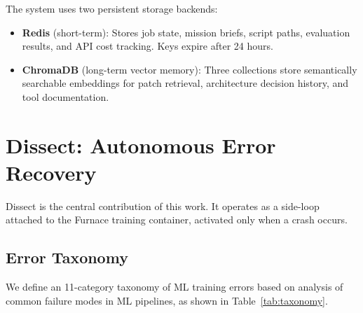 \documentclass[conference]{IEEEtran}
\begin{document}
The system uses two persistent storage backends:

\begin{itemize}
  \item \textbf{Redis} (short-term): Stores job state, mission briefs, script paths,
  evaluation results, and API cost tracking. Keys expire after 24 hours.
  \item \textbf{ChromaDB} (long-term vector memory): Three collections store semantically
  searchable embeddings for patch retrieval, architecture decision history, and tool
  documentation.
\end{itemize}

\section{Dissect: Autonomous Error Recovery}
\label{sec:dissect}

Dissect is the central contribution of this work. It operates as a side-loop attached to
the Furnace training container, activated only when a crash occurs.

\subsection{Error Taxonomy}

We define an 11-category taxonomy of ML training errors based on analysis of common
failure modes in ML pipelines, as shown in Table~\ref{tab:taxonomy}.
\end{document}

